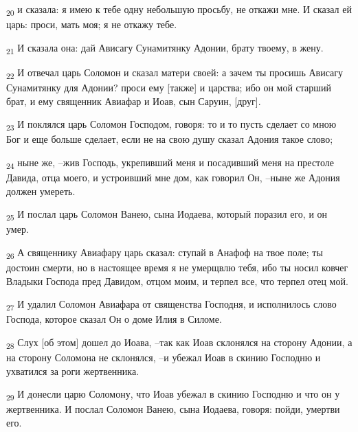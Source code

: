 \begin{tcolorbox}
\textsubscript{20} и сказала: я имею к тебе одну небольшую просьбу, не откажи мне. И сказал ей царь: проси, мать моя; я не откажу тебе.
\end{tcolorbox}
\begin{tcolorbox}
\textsubscript{21} И сказала она: дай Ависагу Сунамитянку Адонии, брату твоему, в жену.
\end{tcolorbox}
\begin{tcolorbox}
\textsubscript{22} И отвечал царь Соломон и сказал матери своей: а зачем ты просишь Ависагу Сунамитянку для Адонии? проси ему [также] и царства; ибо он мой старший брат, и ему священник Авиафар и Иоав, сын Саруин, [друг].
\end{tcolorbox}
\begin{tcolorbox}
\textsubscript{23} И поклялся царь Соломон Господом, говоря: то и то пусть сделает со мною Бог и еще больше сделает, если не на свою душу сказал Адония такое слово;
\end{tcolorbox}
\begin{tcolorbox}
\textsubscript{24} ныне же, --жив Господь, укрепивший меня и посадивший меня на престоле Давида, отца моего, и устроивший мне дом, как говорил Он, --ныне же Адония должен умереть.
\end{tcolorbox}
\begin{tcolorbox}
\textsubscript{25} И послал царь Соломон Ванею, сына Иодаева, который поразил его, и он умер.
\end{tcolorbox}
\begin{tcolorbox}
\textsubscript{26} А священнику Авиафару царь сказал: ступай в Анафоф на твое поле; ты достоин смерти, но в настоящее время я не умерщвлю тебя, ибо ты носил ковчег Владыки Господа пред Давидом, отцом моим, и терпел все, что терпел отец мой.
\end{tcolorbox}
\begin{tcolorbox}
\textsubscript{27} И удалил Соломон Авиафара от священства Господня, и исполнилось слово Господа, которое сказал Он о доме Илия в Силоме.
\end{tcolorbox}
\begin{tcolorbox}
\textsubscript{28} Слух [об этом] дошел до Иоава, --так как Иоав склонялся на сторону Адонии, а на сторону Соломона не склонялся, --и убежал Иоав в скинию Господню и ухватился за роги жертвенника.
\end{tcolorbox}
\begin{tcolorbox}
\textsubscript{29} И донесли царю Соломону, что Иоав убежал в скинию Господню и что он у жертвенника. И послал Соломон Ванею, сына Иодаева, говоря: пойди, умертви его.
\end{tcolorbox}
